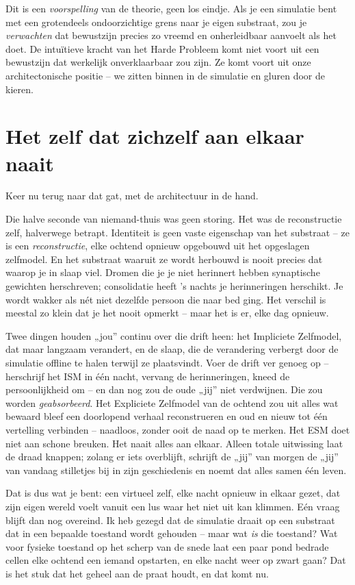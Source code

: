 \documentclass[11pt, twoside, openright]{book}
\begin{document}
Dit is een \textit{voorspelling} van de theorie, geen los eindje. Als je een simulatie bent met een grotendeels ondoorzichtige grens naar je eigen substraat, zou je \textit{verwachten} dat bewustzijn precies zo vreemd en onherleidbaar aanvoelt als het doet. De intuïtieve kracht van het Harde Probleem komt niet voort uit een bewustzijn dat werkelijk onverklaarbaar zou zijn. Ze komt voort uit onze architectonische positie -- we zitten binnen in de simulatie en gluren door de kieren.

\section*{Het zelf dat zichzelf aan elkaar naait}

Keer nu terug naar dat gat, met de architectuur in de hand.

Die halve seconde van niemand-thuis was geen storing. Het was de reconstructie zelf, halverwege betrapt. Identiteit is geen vaste eigenschap van het substraat -- ze is een \textit{reconstructie}, elke ochtend opnieuw opgebouwd uit het opgeslagen zelfmodel. En het substraat waaruit ze wordt herbouwd is nooit precies dat waarop je in slaap viel. Dromen die je je niet herinnert hebben synaptische gewichten herschreven; consolidatie heeft ’s nachts je herinneringen herschikt. Je wordt wakker als nét niet dezelfde persoon die naar bed ging. Het verschil is meestal zo klein dat je het nooit opmerkt -- maar het is er, elke dag opnieuw.

Twee dingen houden „jou” continu over die drift heen: het Impliciete Zelfmodel, dat maar langzaam verandert, en de slaap, die de verandering verbergt door de simulatie offline te halen terwijl ze plaatsvindt. Voer de drift ver genoeg op -- herschrijf het ISM in één nacht, vervang de herinneringen, kneed de persoonlijkheid om -- en dan nog zou de oude „jij” niet verdwijnen. Die zou worden \textit{geabsorbeerd}. Het Expliciete Zelfmodel van de ochtend zou uit alles wat bewaard bleef een doorlopend verhaal reconstrueren en oud en nieuw tot één vertelling verbinden -- naadloos, zonder ooit de naad op te merken. Het ESM doet niet aan schone breuken. Het naait alles aan elkaar. Alleen totale uitwissing laat de draad knappen; zolang er iets overblijft, schrijft de „jij” van morgen de „jij” van vandaag stilletjes bij in zijn geschiedenis en noemt dat alles samen één leven.

Dat is dus wat je bent: een virtueel zelf, elke nacht opnieuw in elkaar gezet, dat zijn eigen wereld voelt vanuit een lus waar het niet uit kan klimmen. Eén vraag blijft dan nog overeind. Ik heb gezegd dat de simulatie draait op een substraat dat in een bepaalde toestand wordt gehouden -- maar wat \textit{is} die toestand? Wat voor fysieke toestand op het scherp van de snede laat een paar pond bedrade cellen elke ochtend een iemand opstarten, en elke nacht weer op zwart gaan? Dat is het stuk dat het geheel aan de praat houdt, en dat komt nu.
\end{document}
